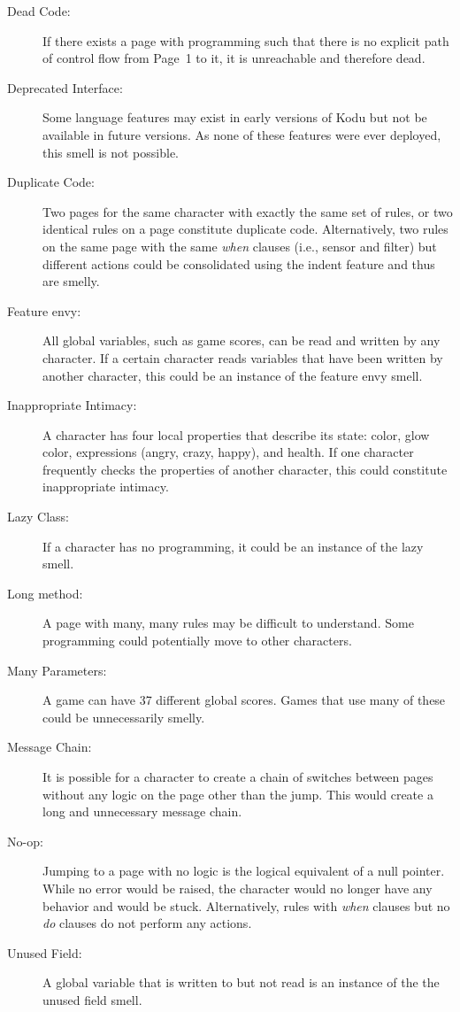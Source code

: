\documentclass{sig-alternate}
\newcommand{\todo}[1]{\textbf{TODO: #1}}
\begin{document}
\begin{description}
\item[Dead Code:] If there exists a page with programming such that there is no explicit path of control flow from Page~1 to it, it is unreachable and therefore dead. 
\item[Deprecated Interface:] Some language features may exist in early versions of Kodu but not be available in future versions. As none of these features were ever deployed, this smell is not possible. 
\item[Duplicate Code:] Two pages for the same character with exactly the same set of rules, or two identical rules on a page constitute duplicate code. Alternatively, two rules on the same page with the same \emph{when} clauses (i.e., sensor and filter) but different actions could be consolidated using the indent feature and thus are smelly. 
\item[Feature envy:] All global variables, such as game scores, can be read and written by any character. If a certain character reads variables that have been written by another character, this could be an instance of the feature envy smell. 
\item[Inappropriate Intimacy:] A character has four local properties that describe its state: color, glow color, expressions (angry, crazy, happy), and health.  If one character frequently checks the properties of another character, this could constitute inappropriate intimacy. 
\item[Lazy Class:] If a character has no programming, it could be an instance of the lazy smell. 
\item[Long method:] A page with many, many rules may be difficult to understand. Some programming could potentially move to other characters. %
\item[Many Parameters:] A game can have 37 different global scores. Games that use many of these could be unnecessarily smelly. %
\item[Message Chain:] It is possible for a character to create a chain of switches between pages without any logic on the page other than the jump. This would create a long and unnecessary message chain. 
\item[No-op:] Jumping to a page with no logic is the logical equivalent of a null pointer. While no error would be raised, the character would no longer have any behavior and would be stuck. Alternatively, rules with \emph{when} clauses but no \emph{do} clauses do not perform any actions. 
\item[Unused Field:] A global variable that is written to but not read is an instance of the the unused field smell. 

\end{description}
\end{document}
